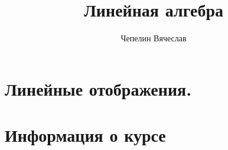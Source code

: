 \documentclass{article}
\title{Линейная алгебра}
\author{Чепелин Вячеслав}
\date{}
\begin{document}
\maketitle
\tableofcontents
\newpage
\section{Линейные отображения.}


\newpage
\section{Информация о курсе}

\end{document}
